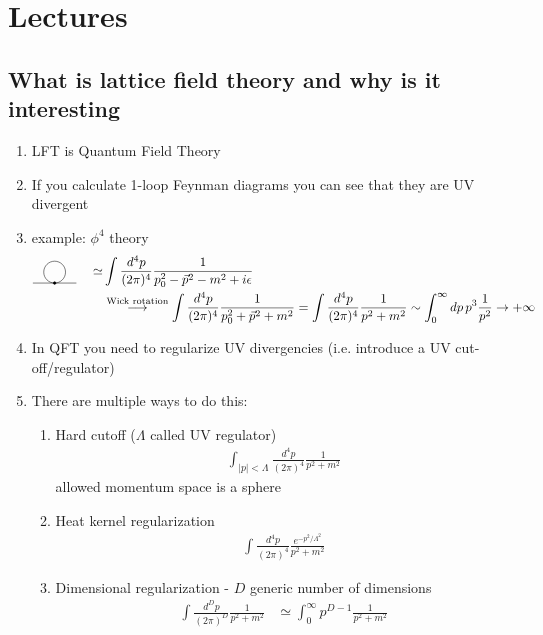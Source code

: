 \documentclass[10pt,a4paper]{article}
\theoremstyle{definition}
\newcommand{\feynOneLoopConnect}{
  \raisebox{0.2em}{%
    \begin{tikzpicture}[scale=0.3, baseline]

      \coordinate (B) at (-2,-1);
      \coordinate (C) at (2,-1);
      \draw (B) -- (C);
      \draw (0,0) circle (1.0);
      \filldraw (0,-1) circle (3.5pt);
    \end{tikzpicture}%
  }
}
\begin{document}


\newpage
\newpage
\section{Lectures}

\subsection{What is lattice field theory and why is it interesting}
\begin{enumerate}
\item LFT is Quantum Field Theory
\item If you calculate 1-loop Feynman diagrams you can see that they are UV divergent
\item example: $\phi^4$ theory
\begin{align}
\feynOneLoopConnect\quad\simeq
&\int\frac{d^4p}{(2\pi)^4}\frac{1}{p_0^2-\vec{p}^2-m^2+i\epsilon}\\
&\overset{\text{Wick rotation}}{\longrightarrow}\int\frac{d^4p}{(2\pi)^4}\frac{1}{p_0^2+\vec{p}^2+m^2}
=\int\frac{d^4p}{(2\pi)^4}\frac{1}{p^2+m^2}\sim\int_0^\infty dp\,p^3 \frac{1}{p^2}\rightarrow +\infty
\end{align}
\item In QFT you need to regularize UV divergencies (i.e. introduce a UV cut-off/regulator)
\item There are multiple ways to do this:
\begin{enumerate}
\item Hard cutoff ($\Lambda$ called UV regulator)
\begin{align}
\int_{|p|<\Lambda} \frac{d^4p}{(2\pi)^4}\frac{1}{p^2+m^2}
\end{align}
allowed momentum space is a sphere
\item Heat kernel regularization
\begin{align}
\int\frac{d^4p}{(2\pi)^4}\frac{e^{-p^2/\Lambda^2}}{p^2+m^2}
\end{align}
\item Dimensional regularization -  $D$ generic number of dimensions
\begin{align}
\int\frac{d^Dp}{(2\pi)^D}\frac{1}{p^2+m^2}
&\simeq\int_0^\infty p^{D-1}\frac{1}{p^2+m^2}\\

\end{align}
\end{enumerate}
\end{enumerate}
\end{document}
